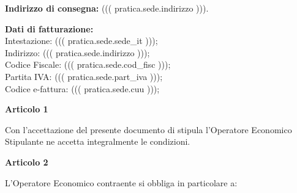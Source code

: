 \textbf{Indirizzo di consegna:} ((( pratica.sede.indirizzo ))). 

\textbf{Dati di fatturazione:} \\
Intestazione: ((( pratica.sede.sede_it ))); \\
Indirizzo: ((( pratica.sede.indirizzo ))); \\
Codice Fiscale: ((( pratica.sede.cod_fisc ))); \\
Partita IVA: ((( pratica.sede.part_iva ))); \\
Codice e-fattura: ((( pratica.sede.cuu ))); \\


\textbf{Articolo 1}

Con l'accettazione del presente documento di stipula l'Operatore
Economico Stipulante ne accetta integralmente le condizioni.

\textbf{Articolo 2}

L'Operatore Economico contraente si obbliga in particolare a:

